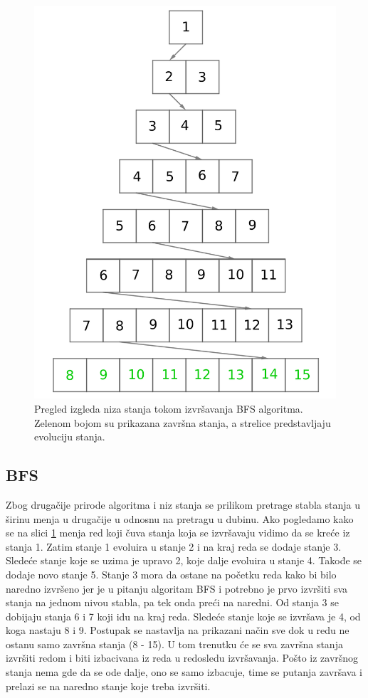 \documentclass[12pt,oneside]{memoir}
\begin{document}
\begin{figure}[ht]
    \centering
    \includegraphics[width=0.6\linewidth]{BFS_stanja_1.png}
    \caption{Pregled izgleda niza stanja tokom izvršavanja BFS algoritma. Zelenom bojom su prikazana završna stanja, a strelice predstavljaju evoluciju stanja.}
    \label{fig:BFS_stanja}
\end{figure}
\bigbreak

\subsection{BFS} 
Zbog drugačije prirode algoritma i niz stanja se prilikom pretrage stabla stanja u širinu menja u drugačije u odnosnu na pretragu u dubinu. Ako pogledamo kako se na slici \ref{fig:BFS_stanja} menja red koji čuva stanja koja se izvršavaju vidimo da se kreće iz stanja 1. Zatim stanje 1 evoluira u stanje 2 i na kraj reda se dodaje stanje 3. Sledeće stanje koje se uzima je upravo 2, koje dalje evoluira u stanje 4. Takođe se dodaje novo stanje 5. Stanje 3 mora da ostane na početku reda kako bi bilo naredno izvršeno jer je u pitanju algoritam BFS i potrebno je prvo izvršiti sva stanja na jednom nivou stabla, pa tek onda preći na naredni. Od stanja 3 se dobijaju stanja 6 i 7 koji idu na kraj reda. Sledeće stanje koje se izvršava je 4, od koga nastaju 8 i 9. Postupak se nastavlja na prikazani način sve dok u redu ne ostanu samo završna stanja (8 - 15). U tom trenutku će se sva završna stanja izvršiti redom i biti izbacivana iz reda u redosledu izvršavanja. Pošto iz završnog stanja nema gde da se ode dalje, ono se samo izbacuje, time se putanja završava i prelazi se na naredno stanje  koje treba izvršiti.
\end{document}
